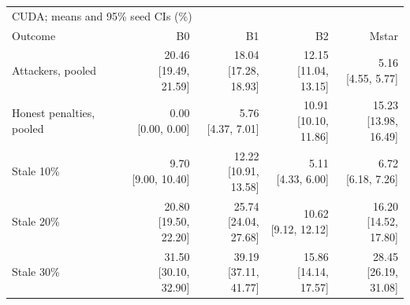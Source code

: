 \begin{tabular}{lrrrr}
\toprule
\multicolumn{5}{l}{CUDA; means and 95\% seed CIs (\%)} \\
Outcome & B0 & B1 & B2 & Mstar \\
\midrule
Attackers, pooled & \shortstack{20.46\\{}[19.49, 21.59]} & \shortstack{18.04\\{}[17.28, 18.93]} & \shortstack{12.15\\{}[11.04, 13.15]} & \shortstack{5.16\\{}[4.55, 5.77]} \\
Honest penalties, pooled & \shortstack{0.00\\{}[0.00, 0.00]} & \shortstack{5.76\\{}[4.37, 7.01]} & \shortstack{10.91\\{}[10.10, 11.86]} & \shortstack{15.23\\{}[13.98, 16.49]} \\
Stale 10\% & \shortstack{9.70\\{}[9.00, 10.40]} & \shortstack{12.22\\{}[10.91, 13.58]} & \shortstack{5.11\\{}[4.33, 6.00]} & \shortstack{6.72\\{}[6.18, 7.26]} \\
Stale 20\% & \shortstack{20.80\\{}[19.50, 22.20]} & \shortstack{25.74\\{}[24.04, 27.68]} & \shortstack{10.62\\{}[9.12, 12.12]} & \shortstack{16.20\\{}[14.52, 17.80]} \\
Stale 30\% & \shortstack{31.50\\{}[30.10, 32.90]} & \shortstack{39.19\\{}[37.11, 41.77]} & \shortstack{15.86\\{}[14.14, 17.57]} & \shortstack{28.45\\{}[26.19, 31.08]} \\
\bottomrule
\end{tabular}
